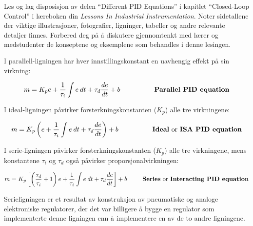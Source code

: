 
Les og lag disposisjon av delen ``Different PID Equations'' i kapitlet ``Closed-Loop Control'' i læreboken din {\it Lessons In Industrial Instrumentation}. Noter sidetallene der viktige illustrasjoner, fotografier, ligninger, tabeller og andre relevante detaljer finnes. Forbered deg på å diskutere gjennomtenkt med lærer og medstudenter de konseptene og eksemplene som behandles i denne lesingen.














I parallell-ligningen har hver innstillingskonstant en uavhengig effekt på sin virkning:

$$m = K_p e + {1 \over \tau_i} \int e \> dt + \tau_d {de \over dt} + b \hbox{\hskip 50pt {\bf Parallel PID equation}}$$

\vskip 10pt

I ideal-ligningen påvirker forsterkningskonstanten ($K_p$) alle tre virkningene:

$$m = K_p \left( e + {1 \over \tau_i} \int e \> dt + \tau_d {de \over dt} \right) + b \hbox{\hskip 50pt {\bf Ideal} or {\bf ISA PID equation}}$$

\vskip 10pt

I serie-ligningen påvirker forsterkningskonstanten ($K_p$) alle tre virkningene, mens konstantene $\tau_i$ og $\tau_d$ også påvirker proporsjonalvirkningen:

$$m = K_p \left[ \left({\tau_d \over \tau_i} + 1 \right) e + {1 \over \tau_i} \int e \> dt + \tau_d {de \over dt} \right] + b \hbox{\hskip 25pt {\bf Series} or {\bf Interacting PID equation}}$$

Serieligningen er et resultat av konstruksjon av pneumatiske og analoge elektroniske regulatorer, der det var billigere å bygge en regulator som implementerte denne ligningen enn å implementere en av de to andre ligningene.






